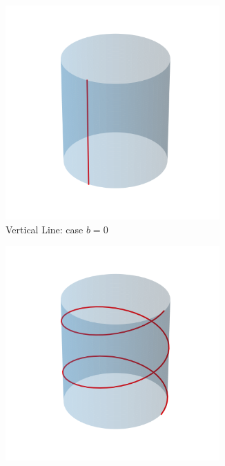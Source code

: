 \documentclass[12pt]{article}
\begin{document}
\begin{figure}[ht]
	\centering
	\begin{subfigure}[b]{0.3\linewidth}
	  \centering
	  \includegraphics[width=0.9\textwidth]{images/cylinder_line.png}
 	  \caption{Vertical Line: case $b=0$}
	  \label{subfig:vertical}
	\end{subfigure}
	\hfill
	\begin{subfigure}[b]{0.3\linewidth}
	  \centering
	  \includegraphics[width=0.9\textwidth]{images/cylinder_helix.png}

\end{subfigure}
\end{figure}
\end{document}
